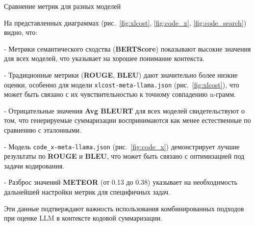 \documentclass[14pt]{article}
\theoremstyle{definition}
\begin{document}
\caption{Сравнение метрик для разных моделей}



На представленных диаграммах (рис.~\ref{fig:xlcost}, \ref{fig:code_x}, \ref{fig:code_search}) видно, что:

    
- Метрики семантического сходства (\textbf{BERTScore}) показывают высокие значения для всех моделей, что указывает на хорошее понимание контекста.
    
- Традиционные метрики (\textbf{ROUGE}, \textbf{BLEU}) дают значительно более низкие оценки, особенно для модели \texttt{xlcost-meta-llama.json} (рис.~\ref{fig:xlcost}), что может быть связано с их чувствительностью к точному совпадению n-грамм.
    
- Отрицательные значения \textbf{Avg BLEURT} для всех моделей свидетельствуют о том, что генерируемые суммаризации воспринимаются как менее естественные по сравнению с эталонными.
    
- Модель \texttt{code\_x-meta-llama.json} (рис.~\ref{fig:code_x}) демонстрирует лучшие результаты по \textbf{ROUGE} и \textbf{BLEU}, что может быть связано с оптимизацией под задачи кодирования.
    
- Разброс значений \textbf{METEOR} (от 0.13 до 0.38) указывает на необходимость дальнейшей настройки метрик для специфичных задач.


Эти данные подтверждают важность использования комбинированных подходов при оценке LLM в контексте кодовой суммаризации.
\end{document}

